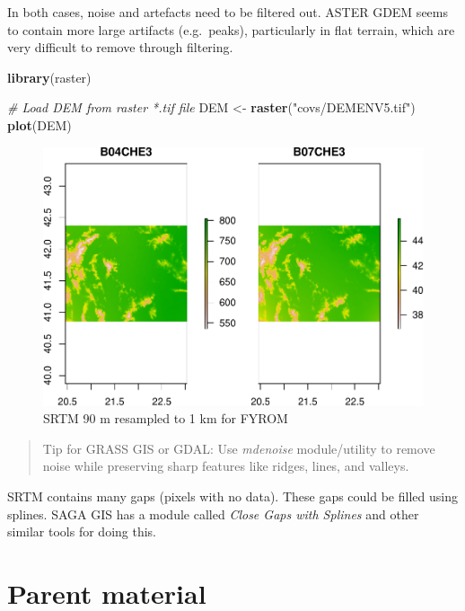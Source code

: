 \documentclass[10pt,b5paper,]{book}
\newenvironment{Shaded}{\begin{snugshade}}{\end{snugshade}}
\newcommand{\CommentTok}[1]{\textcolor[rgb]{0.56,0.35,0.01}{\textit{#1}}}
\newcommand{\KeywordTok}[1]{\textcolor[rgb]{0.13,0.29,0.53}{\textbf{#1}}}
\newcommand{\NormalTok}[1]{#1}
\newcommand{\StringTok}[1]{\textcolor[rgb]{0.31,0.60,0.02}{#1}}
\theoremstyle{definition}
\theoremstyle{definition}
\theoremstyle{definition}
\theoremstyle{remark}
\begin{document}
In both cases, noise and artefacts need to be filtered out. ASTER GDEM
seems to contain more large artifacts (e.g.~peaks), particularly in flat
terrain, which are very difficult to remove through filtering.

\begin{Shaded}
\begin{Highlighting}[]
\KeywordTok{library}\NormalTok{(raster)}

\CommentTok{# Load DEM from raster *.tif file}
\NormalTok{DEM <-}\StringTok{ }\KeywordTok{raster}\NormalTok{(}\StringTok{"covs/DEMENV5.tif"}\NormalTok{)}
\KeywordTok{plot}\NormalTok{(DEM)}
\end{Highlighting}
\end{Shaded}

\begin{figure}
\centering
\includegraphics{SOCMapping_files/figure-latex/unnamed-chunk-21-1.pdf}
\caption{\label{fig:unnamed-chunk-21}SRTM 90 m resampled to 1 km for FYROM}
\end{figure}

\begin{quote}
Tip for GRASS GIS or GDAL: Use \emph{mdenoise} module/utility to remove
noise while preserving sharp features like ridges, lines, and valleys.
\end{quote}

SRTM contains many gaps (pixels with no data). These gaps could be
filled using splines. SAGA GIS has a module called \emph{Close Gaps with
Splines} and other similar tools for doing this.

\hypertarget{parent-material}{%
\section{Parent material}\label{parent-material}}
\end{document}
